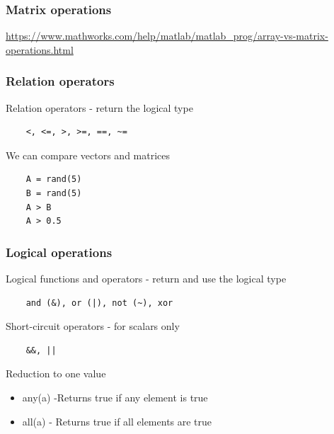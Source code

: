 \documentclass{beamer}
\begin{document}
\begin{frame}
  \frametitle{Matrix operations}
  \noindent{}  
  \url{https://www.mathworks.com/help/matlab/matlab_prog/array-vs-matrix-operations.html}
\end{frame}

\begin{frame}[fragile]
  \frametitle{Relation operators}
  \begin{block}{Relation operators - return the logical type}
  \begin{verbatim}
    <, <=, >, >=, ==, ~=\end{verbatim}  
  \end{block}
  
  \pause
  
  \begin{block}{We can compare vectors and matrices}
  \begin{verbatim}
    A = rand(5)
    B = rand(5)
    A > B
    A > 0.5 \end{verbatim}
  \end{block}
\end{frame}

\begin{frame}[fragile]
  \frametitle{Logical operations}
  \begin{block}{Logical functions and operators - return and use the logical type}
  \begin{verbatim}
    and (&), or (|), not (~), xor\end{verbatim}  
  \end{block}
  
  \begin{block}{Short-circuit operators - for scalars only}
  \begin{verbatim}
    &&, ||\end{verbatim}  
  \end{block}
  
  
  \pause
  
  \begin{block}{Reduction to one value}
  \begin{itemize}
    \item any(a) -Returns true if any element is true
    \item all(a) - Returns true if all elements are true
  \end{itemize}
  \end{block}    
\end{frame}
\end{document}
